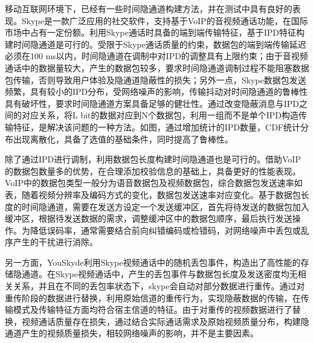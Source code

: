 移动互联网环境下，已经有一些时间隐通道构建方法，并在测试中具有良好的表现。Skype是一款广泛应用的社交软件，支持基于VoIP的音视频通话功能，在国际市场中占有一定份额。利用Skype通话时具备的端到端传输特征，基于IPD特征构建时间隐通道是可行的。受限于Skype通话质量的约束，数据包的端到端传输延迟必须在100 ms以内，时间隐通道在调制中对IPD的调整具有上限约束；由于音视频通话中的数据量较大，产生的数据包较多，要求时间隐通道调制过程不能阻塞数据包传输，否则导致用户体验及隐通道隐蔽性的损失；另外一点，Skype数据包发送频繁，具有较小的IPD分布，受网络噪声的影响，传输抖动对时间隐通道的鲁棒性具有破坏性，要求时间隐通道方案具备足够的健壮性。通过改变隐蔽消息与IPD之间的对应关系，将L bit的数据对应到N个数据包，利用一组而不是单个IPD构造传输特征，是解决该问题的一种方法。如图，通过增加统计的IPD数量，CDF统计分布出现离散化，具备了选值的基础条件，同时提高了鲁棒性。


除了通过IPD进行调制，利用数据包长度构建时间隐通道也是可行的。借助VoIP的数据包数量多的优势，在合理添加校验信息的基础上，具备更好的性能表现。VoIP中的数据包类型一般分为语音数据包及视频数据包，综合数据包发送速率如表，随着视频分辨率及编码方式的变化，数据包发送速率对应变化。基于数据包长度的时间隐通道，需要在发送方设定一个发送缓冲区，首先将待发送的数据包加入缓冲区，根据待发送数据的需求，调整缓冲区中的数据包顺序，最后执行发送操作。为降低误码率，通常需要结合前向纠错编码或检错码，对网络噪声中丢包或乱序产生的干扰进行消除。

另一方面，YouSkyde利用Skype视频通话中的随机丢包事件，构造出了高性能的存储隐通道。在Skype视频通话中，产生的丢包事件与数据包长度及发送密度均无相关关系，并且在不同的丢包率状态下，skype会自动对部分数据进行重传。通过对重传阶段的数据进行替换，利用原始信道的重传行为，实现隐蔽数据的传输，在传输模式及传输特征方面均符合宿主信道的特征。由于对重传的视频数据进行了替换，视频通话质量存在损失，通过结合实际通话需求及原始视频质量分布，构建隐通道产生的视频质量损失，相较网络噪声的影响，并不是主要因素。

